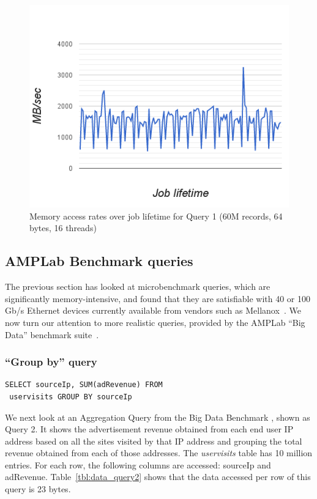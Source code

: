 \documentclass{sig-alternate-05-2015}
\begin{document}
\begin{figure}[h]
\centering
\includegraphics[width=\columnwidth]{time-mem-access-rates-count-64bytes-16threads.png}
\caption{\label{fig:memrate}Memory access rates over job lifetime for Query 1 (60M records, 64 bytes, 16 threads)}
\end{figure}

\subsection{AMPLab Benchmark queries}

The previous section has looked at microbenchmark queries, which are
significantly memory-intensive, and found that they are satisfiable with 40 or
100 Gb/s Ethernet devices currently available from vendors such as
Mellanox~\cite{mellanox100g}.  We now turn our attention to more realistic
queries, provided by the AMPLab ``Big Data'' benchmark
suite~\cite{amplab_benchmark}.

\subsubsection{``Group by'' query}

\begin{Verbatim}[frame=single,label=Query 2]
SELECT sourceIp, SUM(adRevenue) FROM
 uservisits GROUP BY sourceIp
\end{Verbatim}

We next look at an Aggregation Query from the Big Data Benchmark
\cite{bigDataBenchmark}, shown as Query 2.  It shows the advertisement revenue
obtained from each end user IP address based on all the sites visited by that
IP address and grouping  the total revenue obtained from each of those
addresses.  The {\em uservisits} table has 10 million entries. For each row,
the following columns are accessed: sourceIp and adRevenue.
Table~\ref{tbl:data_query2} shows that the data accessed per row of this query
is 23 bytes.
\end{document}
